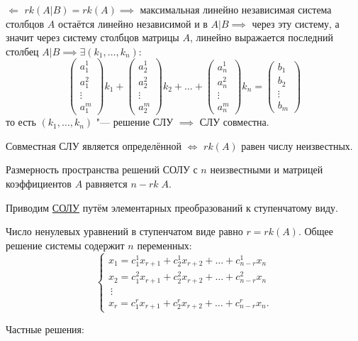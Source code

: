 \begin{Proof}
$\Leftarrow$ $rk(A|B) = rk(A)\implies$ максимальная линейно независимая система столбцов $A$ остаётся линейно независимой и в $A|B\implies$ через эту систему, а значит через систему столбцов матрицы $A$, линейно выражается последний столбец $A|B\implies\exists(k_1,\ldots,k_n)$:
\begin{equation*}
    \begin{pmatrix}
        a_1^1 \\
        a_1^2 \\
        \vdots \\
        a_1^m
    \end{pmatrix} k_1 +
    \begin{pmatrix}
        a_2^1 \\
        a_2^2 \\
        \vdots \\
        a_2^m
    \end{pmatrix} k_2 + \ldots + 
    \begin{pmatrix}
        a_n^1 \\
        a_n^2 \\
        \vdots \\
        a_n^m
    \end{pmatrix} k_n = 
    \begin{pmatrix}
        b_1 \\
        b_2 \\
        \vdots \\
        b_m
    \end{pmatrix}
\end{equation*}
то есть $(k_1,\ldots, k_n)$ "--- решение СЛУ $\implies$ СЛУ совместна.
\end{Proof}

\begin{theorem}
    Совместная СЛУ является определённой $\Leftrightarrow$ $rk(A)$ равен числу неизвестных.
\end{theorem}

\begin{theorem}
    Размерность пространства решений СОЛУ с $n$ неизвестными и матрицей коэффициентов $A$ равняется $n - rk\;A$.
\end{theorem}
\begin{Proof}
    Приводим \hyperref[eq:SOLU]{СОЛУ} путём элементарных преобразований к ступенчатому виду.

    Число ненулевых уравнений в ступенчатом виде равно $r = rk(A)$. 
    Общее решение системы содержит $n$ переменных:
    $$
    \begin{cases}
        x_1 = c_1^1x_{r + 1} + c_2^1x_{r + 2} + \ldots + c_{n - r}^1x_n \\
        x_2 = c_1^2x_{r + 1} + c_2^2x_{r + 2} + \ldots + c_{n - r}^2x_n \\
        ~\vdots \\
        x_r = c_1^rx_{r + 1} + c_2^rx_{r + 2} + \ldots + c_{n - r}^rx_n.
    \end{cases}
    $$
\end{Proof}
Частные решения:

